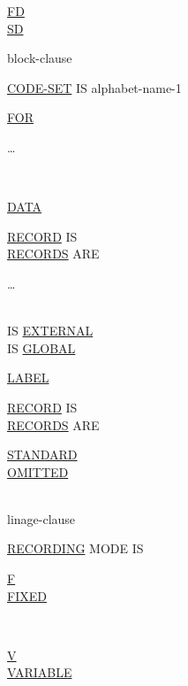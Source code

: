 \documentclass[a4paper,oneside,svgnames]{scrbook}
\makeatletter
\newcommand{\key}[1]{\underline{#1}}
\newcommand{\deleted}[1]{%
  \colorbox{red!75}{#1}}
\newcommand{\pending}[1]{%
  \textcolor{gray!75}{#1}}
\newenvironment{0-1}{$\left[ \begin{tabular}{@{}l@{}}}{\end{tabular} \right]$}
\newenvironment{1=}{$\left\{ \begin{tabular}{@{}l@{}}}{\end{tabular} \right\}$}
\makeatother
\begin{document}
\begin{1=}
  \key{FD} \\
  \key{SD}
\end{1=}
\filename
\begin{0-1}
  block-clause \\

  \pending{
    \key{CODE-SET} IS alphabet-name-1
    \begin{0-1}
      \key{FOR}
      \begin{1=}
        \identifier
      \end{1=} \ldots
    \end{0-1}
  } \\

  \deleted{
    \key{DATA}
    \begin{1=}
      \key{RECORD} IS \\
      \key{RECORDS} ARE
    \end{1=}
    \begin{1=}
      \identifier
    \end{1=}\ldots
  } \\

  IS \key{EXTERNAL} \\
  IS \key{GLOBAL} \\

  \deleted{
    \key{LABEL}
    \begin{1=}
      \key{RECORD} IS \\
      \key{RECORDS} ARE
    \end{1=}
    \begin{1=}
      \key{STANDARD} \\
      \key{OMITTED}
    \end{1=}
  } \\

  linage-clause \\

  \deleted{
    \key{RECORDING} MODE IS
    \begin{1=}
      \begin{1=}
        \key{F} \\
        \key{FIXED} \\
      \end{1=} \\

      \begin{1=}
        \key{V} \\
        \key{VARIABLE} \\
      \end{1=} \\


\end{1=}}
\end{0-1}
\end{document}
